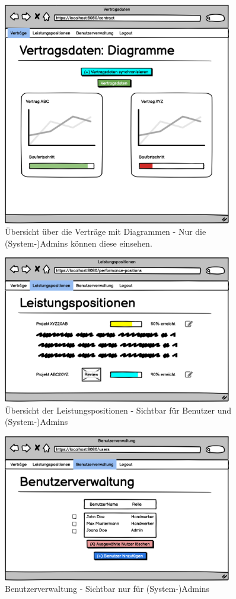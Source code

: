 \begin{figure}[h]
\centering
\includegraphics[width=10cm]{img/mockup_web/admin-vertraage-diagramme.png}
\caption{Übersicht über die Verträge mit Diagrammen - Nur die (System-)Admins können diese einsehen.}
\end{figure}

\begin{figure}[h]
\centering
\includegraphics[width=10cm]{img/mockup_web/admin-und-benutzer-leistungspositionen.png}
\caption{Übersicht der Leistungspositionen - Sichtbar für Benutzer und (System-)Admins}
\end{figure}

\begin{figure}[h]
\centering
\includegraphics[width=10cm]{img/mockup_web/admin-benutzerverwaltung.png}
\caption{Benutzerverwaltung - Sichtbar nur für (System-)Admins}
\end{figure}

